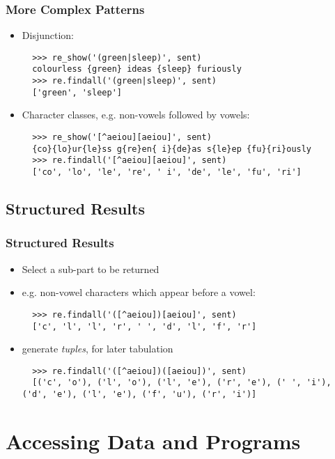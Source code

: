 \documentclass[handout]{beamer}
\begin{document}
\begin{frame}[fragile]
\frametitle{More Complex Patterns}

\begin{itemize}
\item Disjunction:

\begin{verbatim}
  >>> re_show('(green|sleep)', sent)
  colourless {green} ideas {sleep} furiously
  >>> re.findall('(green|sleep)', sent)
  ['green', 'sleep']
\end{verbatim}

\item Character classes, e.g. non-vowels followed by vowels:

\begin{verbatim}
  >>> re_show('[^aeiou][aeiou]', sent)
  {co}{lo}ur{le}ss g{re}en{ i}{de}as s{le}ep {fu}{ri}ously
  >>> re.findall('[^aeiou][aeiou]', sent)
  ['co', 'lo', 'le', 're', ' i', 'de', 'le', 'fu', 'ri']
\end{verbatim}
\end{itemize}
\end{frame}

\subsection{Structured Results}

\begin{frame}[fragile]
\frametitle{Structured Results}
\begin{itemize}
\item Select a sub-part to be returned
\item e.g. non-vowel characters which appear before a vowel:

\begin{verbatim}
  >>> re.findall('([^aeiou])[aeiou]', sent)
  ['c', 'l', 'l', 'r', ' ', 'd', 'l', 'f', 'r']
\end{verbatim}

\item generate \textit{tuples}, for later tabulation

\begin{verbatim}
  >>> re.findall('([^aeiou])([aeiou])', sent)
  [('c', 'o'), ('l', 'o'), ('l', 'e'), ('r', 'e'), (' ', 'i'), ('d', 'e'), ('l', 'e'), ('f', 'u'), ('r', 'i')]
\end{verbatim}
\end{itemize}
\end{frame}

\section{Accessing Data and Programs}
\end{document}
